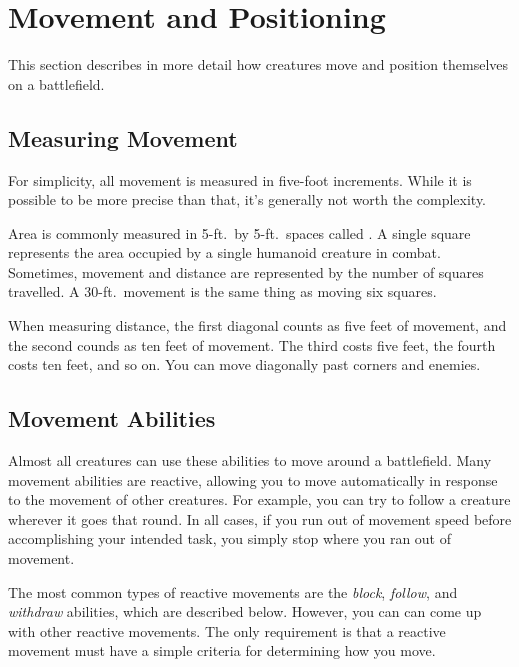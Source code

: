 \section{Movement and Positioning}\label{Movement and Positioning}

    This section describes in more detail how creatures move and position themselves on a battlefield.

    \subsection{Measuring Movement}

        For simplicity, all movement is measured in five-foot increments.
        While it is possible to be more precise than that, it's generally not worth the complexity.

        \label{Squares} Area is commonly measured in 5-ft.\ by 5-ft.\ spaces called .
        A single square represents the area occupied by a single humanoid creature in combat.
        Sometimes, movement and distance are represented by the number of squares travelled.
        A 30-ft.\ movement is the same thing as moving six squares.

        \label{Diagonals} When measuring distance, the first diagonal counts as five feet of movement, and the second counds as ten feet of movement.
        The third costs five feet, the fourth costs ten feet, and so on.
        You can move diagonally past corners and enemies.

    \subsection{Movement Abilities}

        Almost all creatures can use these abilities to move around a battlefield.
        Many movement abilities are reactive, allowing you to move automatically in response to the movement of other creatures.
        For example, you can try to follow a creature wherever it goes that round.
        In all cases, if you run out of movement speed before accomplishing your intended task, you simply stop where you ran out of movement.

        The most common types of reactive movements are the \textit{block}, \textit{follow}, and \textit{withdraw} abilities, which are described below.
        However, you can can come up with other reactive movements.
        The only requirement is that a reactive movement must have a simple criteria for determining how you move.

